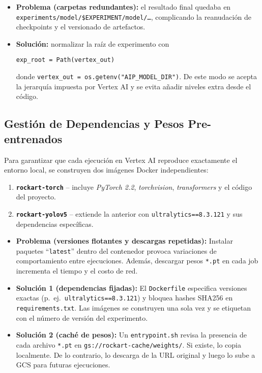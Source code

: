 \begin{itemize}
   \item \textbf{Problema (carpetas redundantes):} el resultado final quedaba en \texttt{experiments/model/\$EXPERIMENT/model/…}, complicando la reanudación de checkpoints y el versionado de artefactos.
   \item \textbf{Solución:} normalizar la raíz de experimento con\par
         \verb|exp_root = Path(vertex_out)|\par
         donde \verb|vertex_out = os.getenv("AIP_MODEL_DIR")|.
         De este modo se acepta la jerarquía impuesta por Vertex AI y se evita añadir niveles extra desde el código.
\end{itemize}

\subsection{Gestión de Dependencias y Pesos Pre-entrenados}\label{ssec:deps}

Para garantizar que cada ejecución en Vertex AI reproduce exactamente el entorno local, se construyen dos imágenes Docker independientes:

\begin{enumerate}
   \item \textbf{\texttt{rockart-torch}} – incluye \textit{PyTorch 2.2}, \textit{torchvision}, \textit{transformers} y el código del proyecto.
   \item \textbf{\texttt{rockart-yolov5}} – extiende la anterior con \texttt{ultralytics==8.3.121} y sus dependencias específicas.
\end{enumerate}

\begin{itemize}
   \item \textbf{Problema (versiones flotantes y descargas repetidas):}
   Instalar paquetes “\texttt{latest}” dentro del contenedor provoca variaciones de comportamiento entre ejecuciones.
   Además, descargar pesos \texttt{*.pt} en cada job incrementa el tiempo y el costo de red.
   \item \textbf{Solución 1 (dependencias fijadas):}
   El \texttt{Dockerfile} especifica versiones exactas (p.\ ej.\ \texttt{ultralytics==8.3.121}) y bloquea hashes SHA256 en \texttt{requirements.txt}.
   Las imágenes se construyen una sola vez y se etiquetan con el número de versión del experimento.
   \item \textbf{Solución 2 (caché de pesos):}
   Un \texttt{entrypoint.sh} revisa la presencia de cada archivo \texttt{*.pt} en \texttt{gs://rockart-cache/weights/}.
   Si existe, lo copia localmente.
   De lo contrario, lo descarga de la URL original y luego lo sube a GCS para futuras ejecuciones.
\end{itemize}

